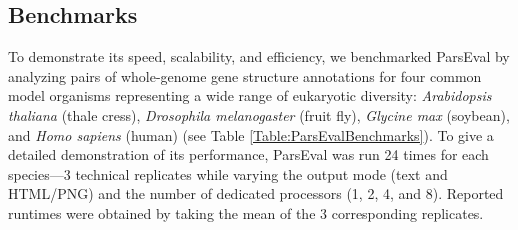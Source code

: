 \subsection{Benchmarks}
To demonstrate its speed, scalability, and efficiency, we benchmarked ParsEval by analyzing pairs of whole-genome gene structure annotations for four common model organisms representing a wide range of eukaryotic diversity: \textit{Arabidopsis thaliana} (thale cress), \textit{Drosophila melanogaster} (fruit fly), \textit{Glycine max} (soybean), and \textit{Homo sapiens} (human) (see Table \ref{Table:ParsEvalBenchmarks}).
To give a detailed demonstration of its performance, ParsEval was run 24 times for each species---3 technical replicates while varying the output mode (text and HTML/PNG) and the number of dedicated processors (1, 2, 4, and 8).
Reported runtimes were obtained by taking the mean of the 3 corresponding replicates.

